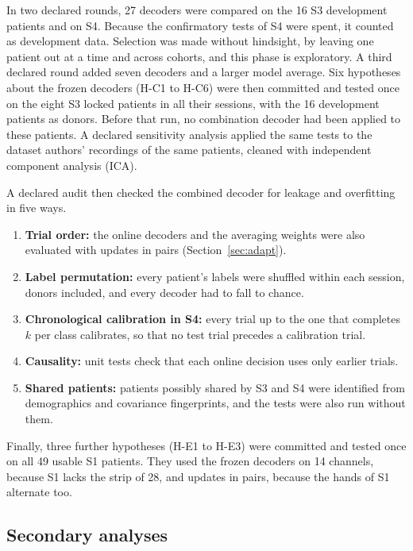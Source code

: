 \documentclass[pdflatex,sn-mathphys-num]{sn-jnl}
\begin{document}
In two declared rounds, 27 decoders were compared on the 16 S3 development patients and on S4. Because the confirmatory tests of S4 were spent, it counted as development data. Selection was made without hindsight, by leaving one patient out at a time and across cohorts, and this phase is exploratory. A third declared round added seven decoders and a larger model average. Six hypotheses about the frozen decoders (H-C1 to H-C6) were then committed and tested once on the eight S3 locked patients in all their sessions, with the 16 development patients as donors. Before that run, no combination decoder had been applied to these patients. A declared sensitivity analysis applied the same tests to the dataset authors' recordings of the same patients, cleaned with independent component analysis (ICA).

A declared audit then checked the combined decoder for leakage and overfitting in five ways.
\begin{enumerate}
\item \textbf{Trial order:} the online decoders and the averaging weights were also evaluated with updates in pairs (Section~\ref{sec:adapt}).
\item \textbf{Label permutation:} every patient's labels were shuffled within each session, donors included, and every decoder had to fall to chance.
\item \textbf{Chronological calibration in S4:} every trial up to the one that completes $k$ per class calibrates, so that no test trial precedes a calibration trial.
\item \textbf{Causality:} unit tests check that each online decision uses only earlier trials.
\item \textbf{Shared patients:} patients possibly shared by S3 and S4 were identified from demographics and covariance fingerprints, and the tests were also run without them.
\end{enumerate}
Finally, three further hypotheses (H-E1 to H-E3) were committed and tested once on all 49 usable S1 patients. They used the frozen decoders on 14 channels, because S1 lacks the strip of 28, and updates in pairs, because the hands of S1 alternate too.

\subsection{Secondary analyses}\label{sec:secondary}
\end{document}
